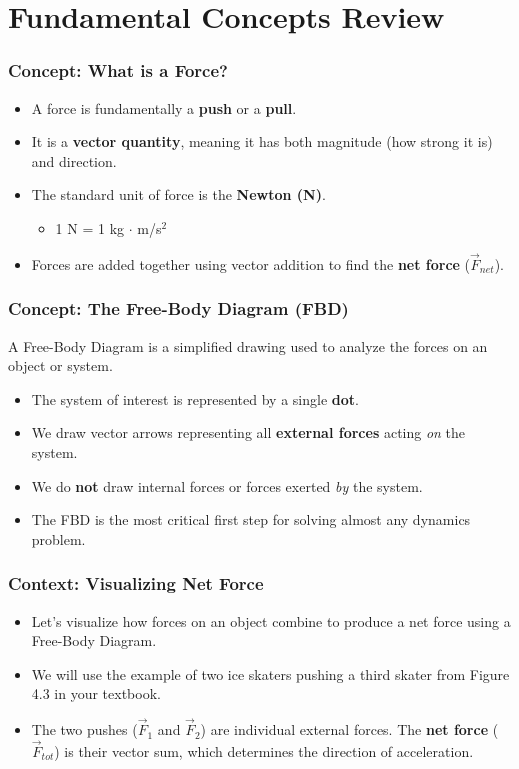 \documentclass{beamer}
\begin{document}
\section{Fundamental Concepts Review}

\begin{frame}
\frametitle{Concept: What is a Force?}
\begin{itemize}
    \item A force is fundamentally a \textbf{push} or a \textbf{pull}. \pause
    \item It is a \textbf{vector quantity}, meaning it has both \alert{magnitude} (how strong it is) and \alert{direction}. \pause
    \item The standard unit of force is the \textbf{Newton (N)}.
    \begin{itemize}
        \item 1 N = 1 kg $\cdot$ m/s$^2$
    \end{itemize} \pause
    \item Forces are added together using vector addition to find the \textbf{net force} ($\vec{F}_{net}$).
\end{itemize}
\end{frame}

\begin{frame}
\frametitle{Concept: The Free-Body Diagram (FBD)}
A Free-Body Diagram is a simplified drawing used to analyze the forces on an object or system.
\begin{itemize}
    \item The system of interest is represented by a single \textbf{dot}. \pause
    \item We draw vector arrows representing all \textbf{external forces} acting \textit{on} the system. \pause
    \item We do \textbf{not} draw internal forces or forces exerted \textit{by} the system. \pause
    \item The FBD is the most critical first step for solving almost any dynamics problem.
\end{itemize}
\end{frame}

\begin{frame}
\frametitle{Context: Visualizing Net Force}
\begin{itemize}
    \item Let's visualize how forces on an object combine to produce a net force using a Free-Body Diagram.
    \pause
    \item We will use the example of two ice skaters pushing a third skater from Figure 4.3 in your textbook.
    \pause
    \item The two pushes ($\vec{F}_1$ and $\vec{F}_2$) are individual external forces. The \textbf{net force} ($\vec{F}_{tot}$) is their vector sum, which determines the direction of acceleration.
\end{itemize}
\end{frame}
\end{document}
